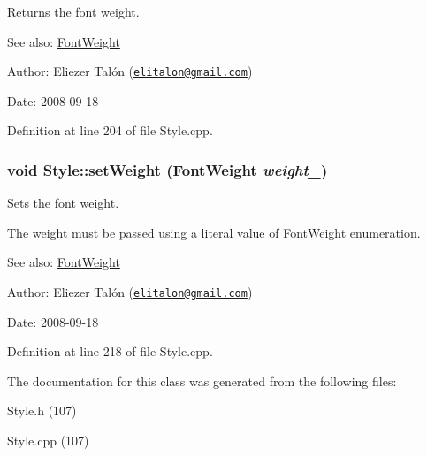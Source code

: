 Returns the font weight. 

\begin{Desc}
\item[See also:]\hyperlink{_font_weight_8h_ecff23ba4a68486421bcea57e095fe66}{FontWeight}\end{Desc}
\begin{Desc}
\item[Author:]Eliezer Talón (\href{mailto:elitalon@gmail.com}{\tt elitalon@gmail.com}) \end{Desc}
\begin{Desc}
\item[Date:]2008-09-18 \end{Desc}


Definition at line 204 of file Style.cpp.\hypertarget{class_style_75f1eaa59c2aff7c52df467c0d9157b1}{
\subsubsection[setWeight]{\setlength{\rightskip}{0pt plus 5cm}void Style::setWeight ({\bf FontWeight} {\em weight\_\-})}}
\label{class_style_75f1eaa59c2aff7c52df467c0d9157b1}


Sets the font weight. 

The weight must be passed using a literal value of FontWeight enumeration.

\begin{Desc}
\item[See also:]\hyperlink{_font_weight_8h_ecff23ba4a68486421bcea57e095fe66}{FontWeight}\end{Desc}
\begin{Desc}
\item[Author:]Eliezer Talón (\href{mailto:elitalon@gmail.com}{\tt elitalon@gmail.com}) \end{Desc}
\begin{Desc}
\item[Date:]2008-09-18 \end{Desc}


Definition at line 218 of file Style.cpp.

The documentation for this class was generated from the following files:\begin{CompactItemize}
\item 
Style.h (107)\item 
Style.cpp (107)\end{CompactItemize}
